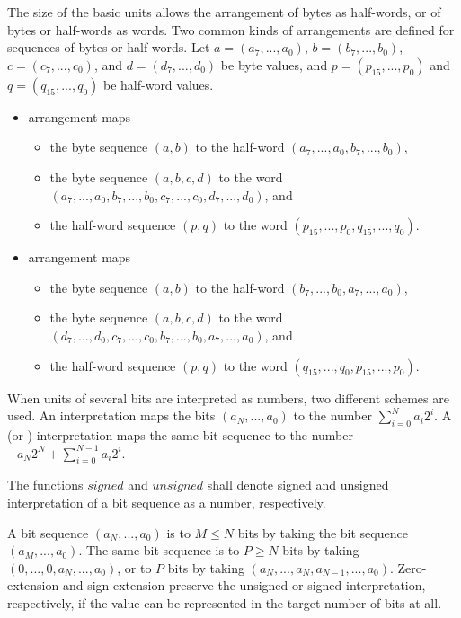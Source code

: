 The size of the basic units allows the arrangement of bytes as half-words, or of bytes or half-words as words. Two common kinds of arrangements are defined for sequences of bytes or half-words. Let $a = (a_7, ..., a_0)$, $b = (b_7, ..., b_0)$, $c = (c_7, ..., c_0)$, and $d = (d_7, ..., d_0)$ be byte values, and $p = (p_{15}, ..., p_0)$ and $q = (q_{15}, ..., q_0)$ be half-word values. 
\begin{itemize}
\item {} arrangement maps
\begin{itemize}
\item the byte sequence $(a, b)$ to the half-word $(a_7, ..., a_0, b_7, ..., b_0)$,
\item the byte sequence $(a, b, c, d)$ to the word\\$(a_7, ..., a_0, b_7, ..., b_0, c_7, ..., c_0, d_7, ..., d_0)$, and
\item the half-word sequence $(p, q)$ to the word $(p_{15}, ..., p_0, q_{15}, ..., q_0)$.
\end{itemize}
\item {} arrangement maps
\begin{itemize}
\item the byte sequence $(a, b)$ to the half-word $(b_7, ..., b_0, a_7, ..., a_0)$, 
\item the byte sequence $(a, b, c, d)$ to the word\\$(d_7, ..., d_0, c_7, ..., c_0, b_7, ..., b_0, a_7, ..., a_0)$, and
\item the half-word sequence $(p, q)$ to the word $(q_{15}, ..., q_0, p_{15}, ..., p_0)$.
\end{itemize}
\end{itemize}

When units of several bits are interpreted as numbers, two different schemes are used. An  interpretation maps the bits $(a_N, ..., a_0)$ to the number $\sum_{i=0}^N a_i2^i$. A  (or ) interpretation maps the same bit sequence to the number $-a_N2^N + \sum_{i=0}^{N-1}a_i2^i$.

The functions $signed$ and $unsigned$ shall denote signed and unsigned interpretation of a bit sequence as a number, respectively.

A bit sequence $(a_N, ..., a_0)$ is  to $M \leq N$ bits by taking the bit sequence $(a_M, ..., a_0)$. The same bit sequence is  to $P \geq N$ bits by taking $(0, ..., 0, a_N, ..., a_0)$, or  to $P$ bits by taking $(a_N, ..., a_N, a_{N-1}, ..., a_0)$. Zero-extension and sign-extension preserve the unsigned or signed interpretation, respectively, if the value can be represented in the target number of bits at all.

